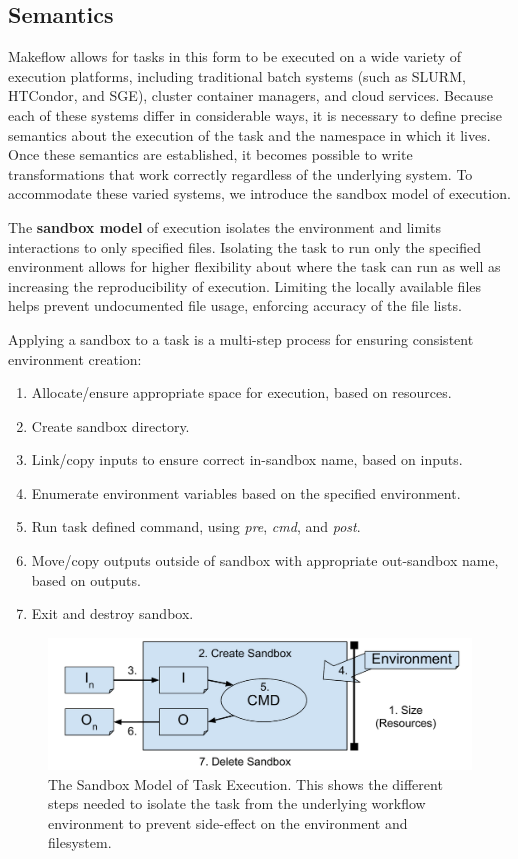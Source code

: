 \documentclass[conference]{IEEEtran}
\begin{document}
\subsection{Semantics}
\label{sec:sandboxing}

Makeflow allows for tasks in this form to be executed on a wide
variety of execution platforms, including traditional batch
systems (such as 
SLURM\cite{Jette02slurm:simple}, 
HTCondor\cite{condor-hunter}, 
and SGE\cite{Microsystems:2001:SGE:560889.792378}), 
cluster container managers, and cloud services.
Because each of these systems differ in considerable ways,
it is necessary to define precise semantics about the
execution of the task and the namespace in which it lives.
Once these semantics are established, it becomes possible
to write transformations that work correctly regardless of the underlying system.
To accommodate these varied systems, we introduce the
sandbox model of execution.

The {\bf sandbox model} of execution isolates the environment 
and limits interactions to only specified files.
Isolating the task to run only the specified environment allows for higher
flexibility about where the task can run as well as increasing the reproducibility
of execution. Limiting the locally available files helps
prevent undocumented file usage, enforcing accuracy of the
file lists.


Applying a sandbox to a task is 
a multi-step process for ensuring consistent environment creation:
\begin{enumerate}
    \item Allocate/ensure appropriate space for execution, based on resources.
    \item Create sandbox directory.
    \item Link/copy inputs to ensure correct in-sandbox name, based on inputs.
    \item Enumerate environment variables based on the specified environment.
    \item Run task defined command, 
    using \emph{pre}, \emph{cmd}, and \emph{post}.
    \item Move/copy outputs outside of sandbox with appropriate out-sandbox name, based on outputs.
    \item Exit and destroy sandbox.
\end{enumerate}


\begin{figure}[H]
\includegraphics[width=\columnwidth]{graphics/sandboxing_short.pdf}
\caption{The Sandbox Model of Task Execution.
This shows the different steps needed to isolate
the task from the underlying workflow environment
to prevent side-effect on the environment and 
filesystem.}
\label{fig:sandbox}
\end{figure}
\end{document}
